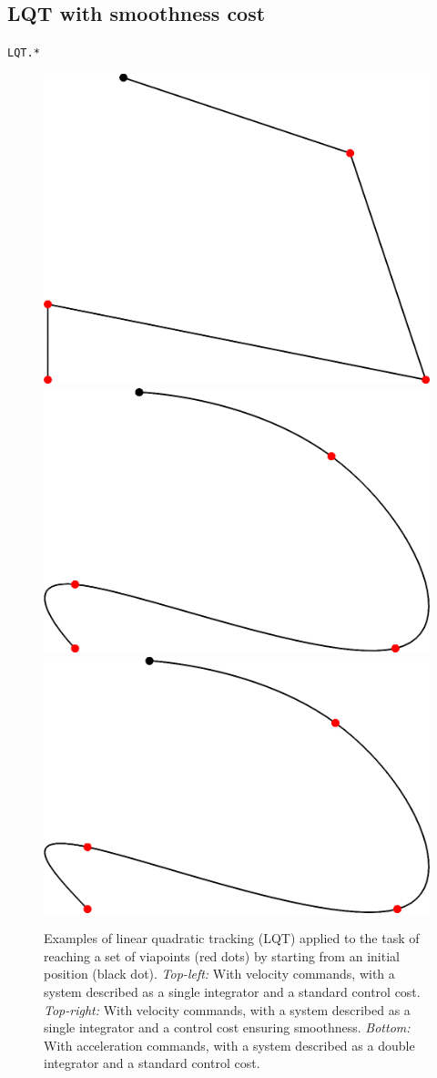 \documentclass[10pt,a4paper]{article} %
\newcommand{\filename}[1]{\colorbox{rr2}{\color{white}\texttt{#1}}}
\begin{document}
\subsection{LQT with smoothness cost}
\begin{flushright}
\filename{LQT.*}
\end{flushright}


\begin{figure}
\vspace{-20pt}
\centering
\includegraphics[width=.14\columnwidth]{images/LQT_smooth01.png}\hspace{8mm}
\includegraphics[width=.14\columnwidth]{images/LQT_smooth02.png}\\[8mm]
\includegraphics[width=.14\columnwidth]{images/LQT_smooth03.png}
\caption{\footnotesize
Examples of linear quadratic tracking (LQT) applied to the task of reaching a set of viapoints (red dots) by starting from an initial position (black dot). \emph{Top-left:} With velocity commands, with a system described as a single integrator and a standard control cost. \emph{Top-right:} With velocity commands, with a system described as a single integrator and a control cost ensuring smoothness. \emph{Bottom:} With acceleration commands, with a system described as a double integrator and a standard control cost.
}
\label{fig:LQT_smooth}
\end{figure}
\end{document}
